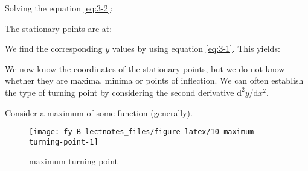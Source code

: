 \documentclass[
  11pt,
  oneside]{book}
\newcommand{\slide}{}
\theoremstyle{definition}
\theoremstyle{definition}
\theoremstyle{definition}
\theoremstyle{definition}
\theoremstyle{remark}
\begin{document}
\begin{slidesonly}

Solving the equation \eqref{eq:3-2}:

\vfill

The stationary points are at:

\vfill

We find the corresponding \(y\) values by using equation \eqref{eq:3-1}. This yields:

\vfill

We now know the coordinates of the stationary points, but we do not know whether they are maxima, minima or points of inflection. We can often establish the type of turning point by considering the second derivative \(\mathrm{d}^{2}y/\mathrm{d} x^2\).

\end{slidesonly}

\slide

Consider a maximum of some function (generally).

\begin{figure}

{\centering \texttt{[image: fy-B-lectnotes\_files/figure-latex/10-maximum-turning-point-1]} 

}

\caption{maximum turning point}\label{fig:10-maximum-turning-point}
\end{figure}
\end{document}
